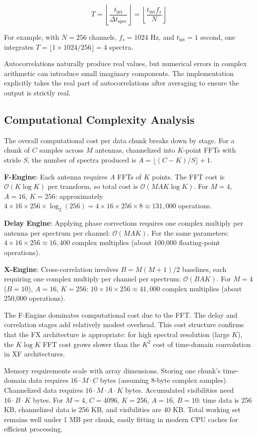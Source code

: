 \begin{equation}
    T = \left\lfloor \frac{t_{\text{int}}}{\Delta t_{\text{spec}}} \right\rfloor = \left\lfloor \frac{t_{\text{int}} f_s}{N} \right\rfloor
\end{equation}

For example, with $N=256$ channels, $f_s=1024$ Hz, and $t_{\text{int}}=1$ second, one integrates $T = \lfloor 1 \times 1024 / 256 \rfloor = 4$ spectra.

Autocorrelations naturally produce real values, but numerical errors in complex arithmetic can introduce small imaginary components. The implementation explicitly takes the real part of autocorrelations after averaging to ensure the output is strictly real.

\subsection{Computational Complexity Analysis}

The overall computational cost per data chunk breaks down by stage. For a chunk of $C$ samples across $M$ antennas, channelized into $K$-point FFTs with stride $S$, the number of spectra produced is $A = \lfloor (C - K) / S \rfloor + 1$.

\textbf{F-Engine}: Each antenna requires $A$ FFTs of $K$ points. The FFT cost is $\mathcal{O}(K \log K)$ per transform, so total cost is $\mathcal{O}(MAK \log K)$. For $M=4$, $A=16$, $K=256$: approximately $4 \times 16 \times 256 \times \log_2(256) = 4 \times 16 \times 256 \times 8 \approx 131{,}000$ operations.

\textbf{Delay Engine}: Applying phase corrections requires one complex multiply per antenna per spectrum per channel: $\mathcal{O}(MAK)$. For the same parameters: $4 \times 16 \times 256 \approx 16{,}400$ complex multiplies (about 100{,}000 floating-point operations).

\textbf{X-Engine}: Cross-correlation involves $B = M(M+1)/2$ baselines, each requiring one complex multiply per channel per spectrum: $\mathcal{O}(BAK)$. For $M=4$ ($B=10$), $A=16$, $K=256$: $10 \times 16 \times 256 \approx 41{,}000$ complex multiplies (about 250{,}000 operations).

The F-Engine dominates computational cost due to the FFT. The delay and correlation stages add relatively modest overhead. This cost structure confirms that the FX architecture is appropriate: for high spectral resolution (large $K$), the $K \log K$ FFT cost grows slower than the $K^2$ cost of time-domain convolution in XF architectures.

Memory requirements scale with array dimensions. Storing one chunk's time-domain data requires $16 \cdot M \cdot C$ bytes (assuming 8-byte complex samples). Channelized data requires $16 \cdot M \cdot A \cdot K$ bytes. Accumulated visibilities need $16 \cdot B \cdot K$ bytes. For $M=4$, $C=4096$, $K=256$, $A=16$, $B=10$: time data is 256 KB, channelized data is 256 KB, and visibilities are 40 KB. Total working set remains well under 1 MB per chunk, easily fitting in modern CPU caches for efficient processing.
